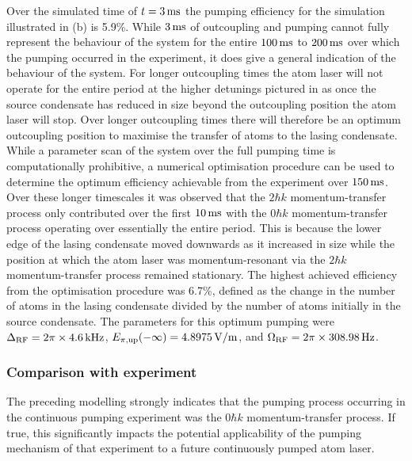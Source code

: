 Over the simulated time of $t = \unit[3]{ms}$ the pumping efficiency for the simulation illustrated in (b) is 5.9\%.  While $\unit[3]{ms}$ of outcoupling and pumping cannot fully represent the behaviour of the system for the entire $\unit[100]{ms}$ to $\unit[200]{ms}$ over which the pumping occurred in the experiment, it does give a general indication of the behaviour of the system.  For longer outcoupling times the atom laser will not operate for the entire period at the higher detunings pictured in  as once the source condensate has reduced in size beyond the outcoupling position the atom laser will stop.  Over longer outcoupling times there will therefore be an optimum outcoupling position to maximise the transfer of atoms to the lasing condensate.  While a parameter scan of the system over the full pumping time is computationally prohibitive, a numerical optimisation procedure can be used to determine the optimum efficiency achievable from the experiment over $\unit[150]{ms}$.  Over these longer timescales it was observed that the $2 \hbar k$ momentum-transfer process only contributed over the first $\unit[10]{ms}$ with the $0 \hbar k$ momentum-transfer process operating over essentially the entire period.  This is because the lower edge of the lasing condensate moved downwards as it increased in size while the position at which the atom laser was momentum-resonant via the $2 \hbar k$ momentum-transfer process remained stationary.  The highest achieved efficiency from the optimisation procedure was 6.7\%, defined as the change in the number of atoms in the lasing condensate divided by the number of atoms initially in the source condensate.  The parameters for this optimum pumping were $\Delta_\text{RF}= 2 \pi \times \unit[4.6]{kHz}$, $E_{\pi, \text{up}}(-\infty) = \unit[4.8975]{V/m}$, and $\Omega_\text{RF} = 2\pi \times \unit[308.98]{Hz}$.


\subsubsection{Comparison with experiment}

The preceding modelling strongly indicates that the pumping process occurring in the continuous pumping experiment was the $0 \hbar k$ momentum-transfer process.  If true, this significantly impacts the potential applicability of the pumping mechanism of that experiment to a future continuously pumped atom laser.  

